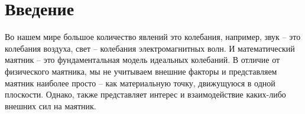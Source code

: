 \section{Введение}
    Во нашем мире большое количество явлений это колебания, например, звук -- это колебания воздуха, свет -- колебания электромагнитных волн. И математический маятник -- это фундаментальная модель идеальных колебаний. В отличие от физического маятника, мы не учитываем внешние факторы и представляем маятник наиболее просто -- как материальную точку, движущуюся в одной плоскости. Однако, также представляет интерес и взаимодействие каких-либо внешних сил на маятник.